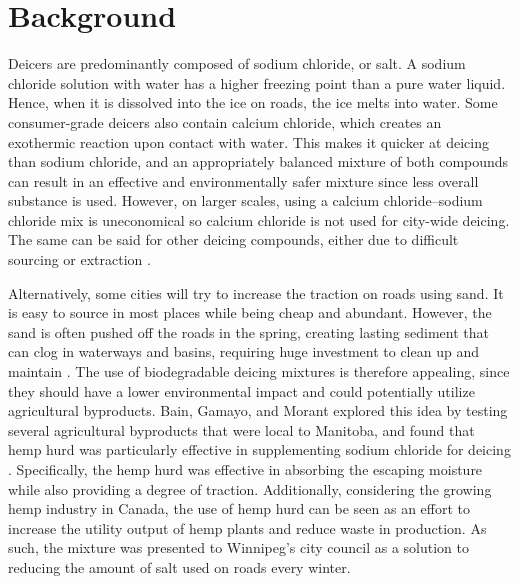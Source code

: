 \section*{Background}

Deicers are predominantly composed of sodium chloride, or salt.
A sodium chloride solution with water has a higher freezing point than a pure water liquid.
Hence, when it is dissolved into the ice on roads, the ice melts into water.
Some consumer-grade deicers also contain calcium chloride, which creates an exothermic reaction upon contact with water.
This makes it quicker at deicing than sodium chloride, and an appropriately balanced mixture of both compounds can result in an effective and environmentally safer mixture since less overall substance is used.
However, on larger scales, using a calcium chloride--sodium chloride mix is uneconomical so calcium chloride is not used for city-wide deicing.
The same can be said for other deicing compounds, either due to difficult sourcing or extraction \parencite{ARF15}.

Alternatively, some cities will try to increase the traction on roads using sand.
It is easy to source in most places while being cheap and abundant.
However, the sand is often pushed off the roads in the spring, creating lasting sediment that can clog in waterways and basins, requiring huge investment to clean up and maintain \parencite{EPA20}.
The use of biodegradable deicing mixtures is therefore appealing, since they should have a lower environmental impact and could potentially utilize agricultural byproducts.
Bain, Gamayo, and Morant explored this idea by testing several agricultural byproducts that were local to Manitoba, and found that hemp hurd was particularly effective in supplementing sodium chloride for deicing \parencite{KAV21}.
Specifically, the hemp hurd was effective in absorbing the escaping moisture while also providing a degree of traction.
Additionally, considering the growing hemp industry in Canada, the use of hemp hurd can be seen as an effort to increase the utility output of hemp plants and reduce waste in production.
As such, the mixture was presented to Winnipeg's city council as a solution to reducing the amount of salt used on roads every winter.
